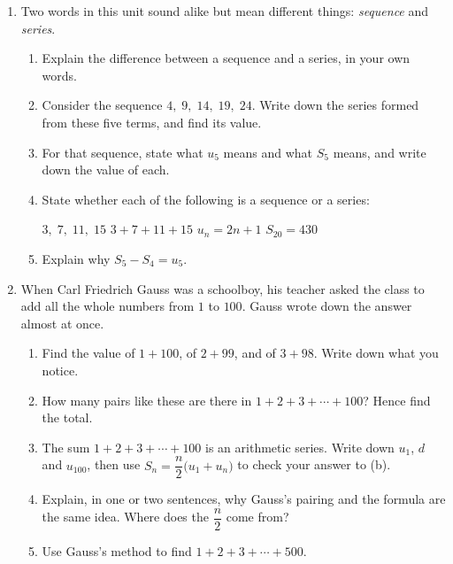 \documentclass[12pt, twoside]{article}
\begin{document}
\begin{enumerate}[itemsep=0.15cm]
\newpage

\item[2.]

Two words in this unit sound alike but mean different things:
\emph{sequence} and \emph{series}.

\begin{enumerate}[itemsep=0.1cm]
  \item Explain the difference between a sequence and a series, in your own
  words.
  \item Consider the sequence $4,\; 9,\; 14,\; 19,\; 24$. Write down the
  series formed from these five terms, and find its value.
  \item For that sequence, state what $u_{5}$ means and what $S_{5}$ means,
  and write down the value of each.
  \item State whether each of the following is a sequence or a series:

  \hspace*{1em} $3,\; 7,\; 11,\; 15$ \hfill $3 + 7 + 11 + 15$ \hfill
  $u_{n} = 2n + 1$ \hfill $S_{20} = 430$ \hspace*{1em}
  \item Explain why $S_{5} - S_{4} = u_{5}$.
\end{enumerate}


\newpage

\item[3.]

When Carl Friedrich Gauss was a schoolboy, his teacher asked the class to
add all the whole numbers from $1$ to $100$. Gauss wrote down the answer
almost at once.

\begin{enumerate}[itemsep=0.1cm]
  \item Find the value of $1 + 100$, of $2 + 99$, and of $3 + 98$. Write
  down what you notice.
  \item How many pairs like these are there in $1 + 2 + 3 + \cdots + 100$?
  Hence find the total.
  \item The sum $1 + 2 + 3 + \cdots + 100$ is an arithmetic series. Write
  down $u_{1}$, $d$ and $u_{100}$, then use
  $S_{n} = \dfrac{n}{2}\bigl(u_{1} + u_{n}\bigr)$ to check your answer
  to (b).
  \item Explain, in one or two sentences, why Gauss's pairing and the
  formula are the same idea. Where does the $\dfrac{n}{2}$ come from?
  \item Use Gauss's method to find $1 + 2 + 3 + \cdots + 500$.
\end{enumerate}


\end{enumerate}
\end{document}
